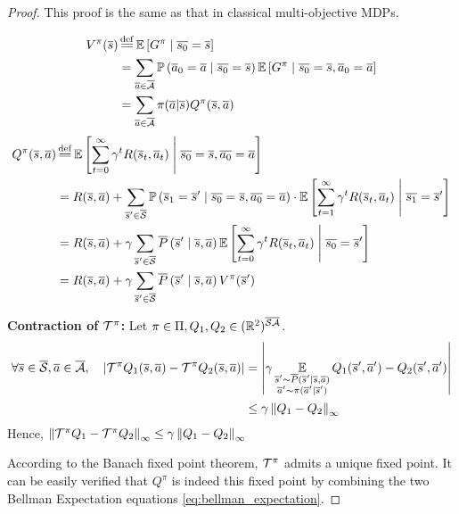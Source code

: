 \begin{proof}
This proof is the same as that in classical multi-objective MDPs.

\begin{align*}
    V^\pi(\os) &\eqdef \expectedvalue\left[ G^\pi \condbar \ov{s_0} = \os\right] \\
    &=\sum_{\oa\in\ocA} \probability{\oa_0 = \oa \condbar\ov{s_0} = \os} \expectedvalue\left[ G^\pi \condbar \ov{s_0} = \os, \oa_0 = \oa\right]\\
    &= \sum_{\oa\in\ocA} \pi(\oa | \os) Q^\pi(\os,\oa)
\end{align*}
\begin{align*}
    Q^\pi(\os, \oa) &\eqdef \expectedvalue\left[\sum_{t=0}^\infty \gamma^t R(\os_t, \oa_t)\condbar \ov{s_0} = \os, \ov{a_0} = \oa\right] \\
    &= R(\os, \oa) + \sum_{\os'\in\ocS}\probability{\os_1 = \os' \condbar\ov{s_0} = \os, \ov{a_0} = \oa}\cdot \expectedvalue\left[\sum_{t=1}^\infty \gamma^t R(\os_t, \oa_t)\condbar \ov{s_1} = \os'\right] \\
    &= R(\os, \oa) + \gamma\sum_{\os'\in\ocS}\ov{P}\left(\os' \condbar\os, \oa\right) \expectedvalue\left[\sum_{t=0}^\infty \gamma^t R(\os_t, \oa_t) \condbar \ov{s_0} = \os'\right] \\
    &=  R(\os, \oa) + \gamma\sum_{\os'\in\ocS}\ov{P}\left(\os' \condbar\os, \oa\right) V^\pi(\os')
\end{align*}

\textbf{Contraction of $\mathcal{T}^\pi$:}
Let $\pi\in\Pi, Q_1, Q_2\in(\mathbb{R}^2)^{\overline{\mathcal{S}}\overline{\mathcal{A}}}$.
\begin{align*}
    \forall \overline{s}\in\overline{\mathcal{S}}, \overline{a}\in\overline{\mathcal{A}},\quad \left|\mathcal{T}^\pi Q_1(\overline{s},\overline{a}) - \mathcal{T}^\pi Q_2(\overline{s},\overline{a})\right| &= \left|\gamma\operatorname*{\mathbb{E}}\limits_{\substack{\overline{s}'\sim\overline{P}(\overline{s}'|\overline{s},\overline{a}) \\ \overline{a}'\sim\pi(\overline{a}'|\overline{s}')}} Q_1(\overline{s}',\overline{a}') - Q_2(\overline{s}',\overline{a}')\right|\\
    &\leq \gamma\left\|Q_1-Q_2\right\|_\infty
\end{align*}
Hence, $\left\|\mathcal{T}^\pi Q_1  - \mathcal{T}^\pi Q_2 \right\|_\infty \leq \gamma\left\|Q_1-Q_2\right\|_\infty$

According to the Banach fixed point theorem, $\mathcal{T}^\pi$ admits a unique fixed point.
It can be easily verified that $Q^\pi$ is indeed this fixed point by combining the two Bellman Expectation equations \eqref{eq:bellman_expectation}.

\end{proof}

